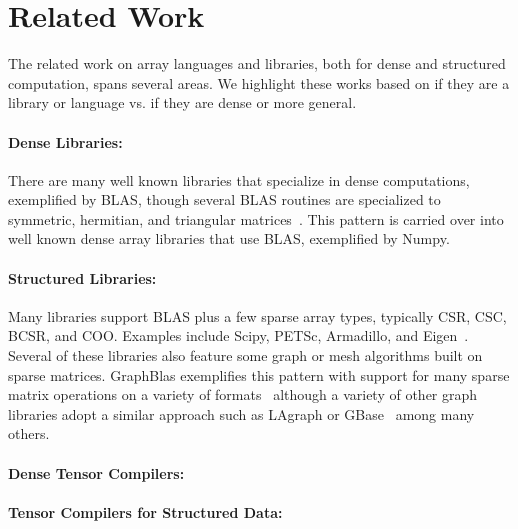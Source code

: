 \section{Related Work}

The related work on array languages and libraries, both for dense and structured computation, spans several areas.
%
We highlight these works based on if they are a library or language vs. if they are dense or more general.

\paragraph{Dense Libraries:} There are many well known libraries that specialize in dense computations, exemplified by BLAS, though several BLAS routines are specialized to symmetric, hermitian, and triangular matrices~\cite{Anderson1999}.
%
This pattern is carried over into well known dense array libraries that use BLAS, exemplified by Numpy.

\paragraph{Structured Libraries:}

Many libraries support BLAS plus a few sparse array types, typically CSR, CSC, BCSR, and COO.
%
Examples include Scipy, PETSc, Armadillo, and Eigen~\cite{virtanen2020scipy, abhyankarpetsc, Rumengan2021, eigenweb}.
%
Several of these libraries also feature some graph or mesh algorithms built on sparse matrices.
%
GraphBlas exemplifies this pattern with support for many sparse matrix operations on a variety of formats~\cite{kepner2016mathematical} although a variety of other graph libraries adopt a similar approach such as LAgraph or GBase~\cite{mattson2019lagraph, kang2011gbase} among many others.



\paragraph{Dense Tensor Compilers:}

\paragraph{Tensor Compilers for Structured Data:}




